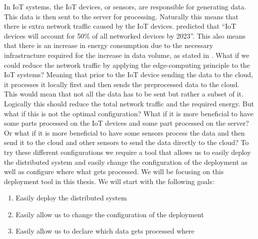 \documentclass[a4paper]{article}
\begin{document}
In IoT systems, the IoT devices, or sensors, are responsible for generating data. This data is then sent to the server for processing. Naturally this means that there is extra network traffic caused by the IoT devices. \cite{differentnetworkneedsiot} predicted that \enquote{IoT devices will account for 50\% of all networked devices by 2023}. This also means that there is an increase in energy consumption due to the necessary infrastructure required for the increase in data volume, as stated in \cite{datavolumeeffects}. What if we could reduce the network traffic by applying the edge-computing principle to the IoT systems? Meaning that prior to the IoT device sending the data to the cloud, it processes it locally first and then sends the preprocessed data to the cloud. This would mean that not all the data has to be sent but rather a subset of it. Logically this should reduce the total network traffic and the required energy. But what if this is not the optimal configuration? What if it is more beneficial to have some parts processed on the IoT devices and some part processed on the server? Or what if it is more beneficial to have some sensors process the data and then send it to the cloud and other sensors to send the data directly to the cloud? To try these different configurations we require a tool that allows us to easily deploy the distributed system and easily change the configuration of the deployment as well as configure where what gets processed. We will be focusing on this deployment tool in this thesis. We will start with the following goals:
\begin{enumerate}
    \item Easily deploy the distributed system
    \item Easily allow us to change the configuration of the deployment
    \item Easily allow us to declare which data gets processed where
\end{enumerate}
\end{document}
